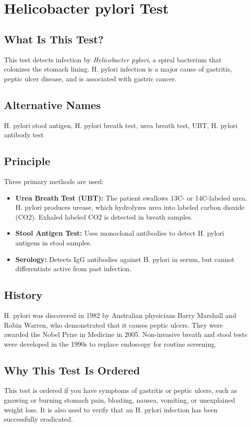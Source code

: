 \chapter{Helicobacter pylori Test}

\section*{What Is This Test?}
This test detects infection by \textit{Helicobacter pylori}, a spiral bacterium that colonizes the stomach lining. H. pylori infection is a major cause of gastritis, peptic ulcer disease, and is associated with gastric cancer.

\section*{Alternative Names}
H. pylori stool antigen, H. pylori breath test, urea breath test, UBT, H. pylori antibody test

\section*{Principle}
Three primary methods are used:
\begin{itemize}
    \item \textbf{Urea Breath Test (UBT):} The patient swallows 13C- or 14C-labeled urea. H. pylori produces urease, which hydrolyzes urea into labeled carbon dioxide (CO2). Exhaled labeled CO2 is detected in breath samples.
    \item \textbf{Stool Antigen Test:} Uses monoclonal antibodies to detect H. pylori antigens in stool samples.
    \item \textbf{Serology:} Detects IgG antibodies against H. pylori in serum, but cannot differentiate active from past infection.
\end{itemize}

\section*{History}
H. pylori was discovered in 1982 by Australian physicians Barry Marshall and Robin Warren, who demonstrated that it causes peptic ulcers. They were awarded the Nobel Prize in Medicine in 2005. Non-invasive breath and stool tests were developed in the 1990s to replace endoscopy for routine screening.

\section*{Why This Test Is Ordered}
This test is ordered if you have symptoms of gastritis or peptic ulcers, such as gnawing or burning stomach pain, bloating, nausea, vomiting, or unexplained weight loss. It is also used to verify that an H. pylori infection has been successfully eradicated.


